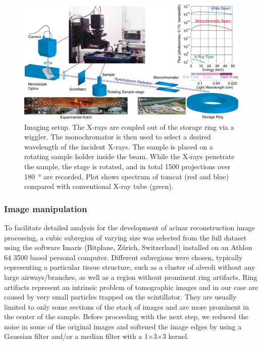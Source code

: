 \begin{figure}[h]
	\centering
	\includegraphics[width=\imsize]{img/Tsuda2008/Tsuda-02}
	\caption[SRXTM imaging setup]{Imaging setup. The X-rays are coupled out of the storage ring via a wiggler. The monochromator is then used to select a desired wavelength of the incident
X-rays. The sample is placed on a rotating sample holder inside the beam. While the X-rays penetrate the sample, the stage is rotated, and in total 1500 projections over \SI{180}{\degree} are recorded. Plot shows spectrum of \ac{tomcat} (red and blue) compared with conventional X-ray tube (green).}
	\label{fig:imaging setup}
\end{figure}

\subsubsection{Image manipulation}
To facilitate detailed analysis for the development of \threed acinar reconstruction image processing, a cubic subregion of varying size was selected from the full dataset using the software Imaris (Bitplane, Zürich, Switzerland) installed on an Athlon 64 3500 based personal computer. Different subregions were chosen, typically representing a particular tissue structure, such as a cluster of alveoli without any large airways/branches, as well as a region without prominent ring artifacts. Ring artifacts represent an intrinsic problem of tomographic images and in our case are caused by very small particles trapped on the scintillator. They are usually limited to only some sections of the stack of images and are more prominent in the center of the sample. Before proceeding with the next step, we reduced the noise in some of the original \twod images and softened the image edges by using a Gaussian filter and/or a median filter with a 1$\times$3$\times$3 kernel.

